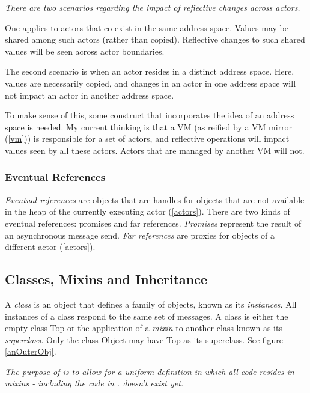 \documentclass{article}
\newcommand{\code}[1]{{\sf #1}}
\begin{document}
{\it
There are two scenarios regarding the impact of reflective changes across actors.

One applies to actors that co-exist in the same address space. Values may be shared among such actors  (rather than copied). Reflective changes to such shared values will be seen across actor boundaries.

The second scenario is when an actor resides in a distinct address space. Here, values are necessarily copied, and changes in an actor in one address space will not impact an actor in another address space.

To make sense of this, some construct that incorporates the idea of an address space is needed.
My current thinking is that a VM (as reified by a VM mirror (\ref{vm})) is responsible for a set of actors, and reflective operations will impact values seen by all these actors. Actors that are managed by another VM will not. 
}

\subsubsection{Eventual References}
\label{eventualReferences}

{\em Eventual references} are objects that are handles for objects that are not  available in the heap of the currently executing actor (\ref{actors}).  There are two kinds of eventual references: promises and far references.
{\em Promises} represent the result of an asynchronous message send.  {\em Far references} are proxies for objects of a different actor (\ref{actors}). 



\subsection{Classes, Mixins and Inheritance}
\label{classes}

A {\em class} is an  object that defines a family of objects, known as its {\em instances}.  All instances of a class respond to the same set of messages. A class is either the empty class \code{Top} or the application of a {\em mixin}  to another class known as its {\em superclass.}   Only the class  \code{Object} may have \code{Top} as its superclass.  See figure \ref{anOuterObj}.

{\it
The purpose of  is to allow for a uniform definition in which all code resides in mixins - including the code in .  doesn't exist yet.  
}
\end{document}
